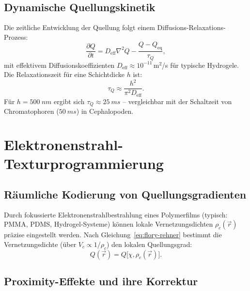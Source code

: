 ﻿\documentclass[a4paper,12pt]{scrreprt}
\theoremstyle{definition}
\begin{document}
\subsection{Dynamische Quellungskinetik}

Die zeitliche Entwicklung der Quellung folgt einem Diffusions-Relaxations-Prozess:
\begin{equation}
  \frac{\partial Q}{\partial t} = D_\mathrm{eff} \nabla^2 Q - \frac{Q - Q_\mathrm{eq}}{\tau_Q},
\end{equation}
mit effektivem Diffusionskoeffizienten $D_\mathrm{eff} \approx 10^{-11}$\,m$^2$/s
für typische Hydrogele. Die Relaxationszeit für eine Schichtdicke $h$ ist:
\begin{equation}
  \tau_Q \approx \frac{h^2}{\pi^2 D_\mathrm{eff}}.
\end{equation}
Für $h = \SI{500}{nm}$ ergibt sich $\tau_Q \approx \SI{25}{ms}$ -- vergleichbar
mit der Schaltzeit von Chromatophoren ($\SI{50}{ms}$) in Cephalopoden.

\section{Elektronenstrahl-Texturprogrammierung}

\subsection{Räumliche Kodierung von Quellungsgradienten}

Durch fokussierte Elektronenstrahlbestrahlung eines Polymerfilms (typisch:
PMMA, PDMS, Hydrogel-Systeme) können lokale Vernetzungsdichten $\rho_c(\vec{r})$
präzise eingestellt werden. Nach Gleichung~\eqref{eq:flory-rehner} bestimmt die
Vernetzungsdichte (über $V_c \propto 1/\rho_c$) den lokalen Quellungsgrad:
\begin{equation}
  Q(\vec{r}) = Q\bigl[\chi, \rho_c(\vec{r})\bigr].
\end{equation}

\subsection{Proximity-Effekte und ihre Korrektur}
\end{document}
